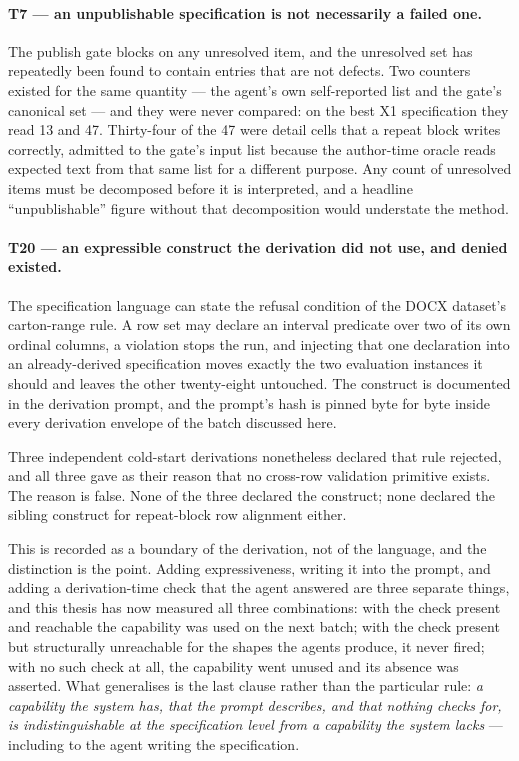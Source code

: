 \paragraph{T7 --- an unpublishable specification is not necessarily a failed one.}
The publish gate blocks on any unresolved item, and the unresolved set has repeatedly been
found to contain entries that are not defects. Two counters existed for the same quantity ---
the agent's own self-reported list and the gate's canonical set --- and they were never
compared: on the best X1 specification they read 13 and 47. Thirty-four of the 47 were detail
cells that a repeat block writes correctly, admitted to the gate's input list because the
author-time oracle reads expected text from that same list for a different purpose. Any count
of unresolved items must be decomposed before it is interpreted, and a headline
``unpublishable'' figure without that decomposition would understate the method.

\paragraph{T20 --- an expressible construct the derivation did not use, and denied existed.}
The specification language can state the refusal condition of the DOCX dataset's carton-range
rule. A row set may declare an interval predicate over two of its own ordinal columns, a
violation stops the run, and injecting that one declaration into an already-derived
specification moves exactly the two evaluation instances it should and leaves the other
twenty-eight untouched. The construct is documented in the derivation prompt, and the prompt's
hash is pinned byte for byte inside every derivation envelope of the batch discussed here.

Three independent cold-start derivations nonetheless declared that rule rejected, and all three
gave as their reason that no cross-row validation primitive exists. The reason is false. None of
the three declared the construct; none declared the sibling construct for repeat-block row
alignment either.

This is recorded as a boundary of the derivation, not of the language, and the distinction is
the point. Adding expressiveness, writing it into the prompt, and adding a derivation-time check
that the agent answered are three separate things, and this thesis has now measured all three
combinations: with the check present and reachable the capability was used on the next batch;
with the check present but structurally unreachable for the shapes the agents produce, it never
fired; with no such check at all, the capability went unused and its absence was asserted. What
generalises is the last clause rather than the particular rule: \emph{a capability the system
has, that the prompt describes, and that nothing checks for, is indistinguishable at the
specification level from a capability the system lacks} --- including to the agent writing the
specification.

